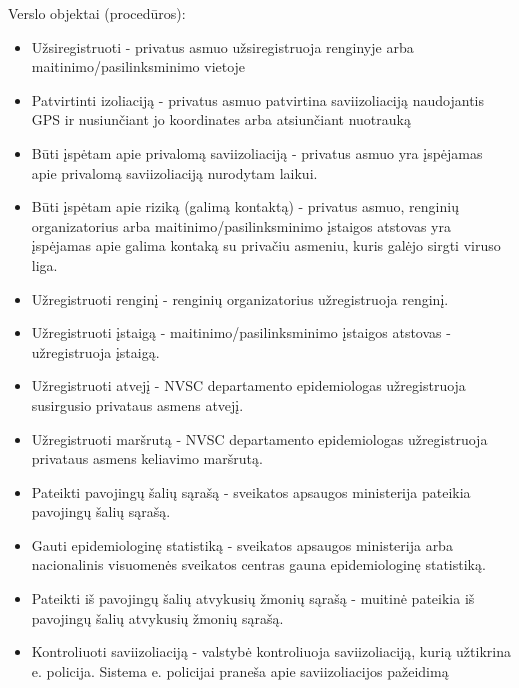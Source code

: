 \documentclass{VUMIFPSkursinis}
\begin{document}
\noindent Verslo objektai (procedūros):
	\begin{itemize}
		\item Užsiregistruoti - privatus asmuo užsiregistruoja renginyje arba maitinimo/pasilinksminimo vietoje
		\item Patvirtinti izoliaciją - privatus asmuo patvirtina saviizoliaciją naudojantis GPS ir nusiunčiant jo koordinates arba atsiunčiant nuotrauką
		\item Būti įspėtam apie privalomą saviizoliaciją - privatus asmuo yra įspėjamas apie privalomą saviizoliaciją nurodytam laikui.
		\item Būti įspėtam apie riziką (galimą kontaktą) - privatus asmuo, renginių organizatorius arba maitinimo/pasilinksminimo įstaigos atstovas yra įspėjamas apie galima kontaką su privačiu asmeniu, kuris galėjo sirgti viruso liga.
		\item Užregistruoti renginį - renginių organizatorius užregistruoja renginį.
		\item Užregistruoti įstaigą - maitinimo/pasilinksminimo įstaigos atstovas - užregistruoja įstaigą.
		\item Užregistruoti atvejį - NVSC departamento epidemiologas užregistruoja susirgusio privataus asmens atvejį.
		\item Užregistruoti maršrutą - NVSC departamento epidemiologas užregistruoja privataus asmens keliavimo maršrutą.
		\item Pateikti pavojingų šalių sąrašą - sveikatos apsaugos ministerija pateikia pavojingų šalių sąrašą.
		\item Gauti epidemiologinę statistiką - sveikatos apsaugos ministerija arba nacionalinis visuomenės sveikatos centras gauna epidemiologinę statistiką.
		\item Pateikti iš pavojingų šalių atvykusių žmonių sąrašą - muitinė pateikia iš pavojingų šalių atvykusių žmonių sąrašą.
		\item Kontroliuoti saviizoliaciją - valstybė kontroliuoja saviizoliaciją, kurią užtikrina e. policija. Sistema e. policijai praneša apie saviizoliacijos pažeidimą
	\end{itemize}
\end{document}
